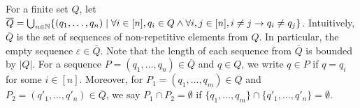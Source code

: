


%






For a finite set $Q$, let $\overline{Q} = \bigcup_{n\in \mathbb{N}}\{ (q_1, \ldots, q_n) \mid \forall i \in [n], q_i \in Q \wedge \forall i,j \in[n], i \neq j \rightarrow q_i \neq q_j \}$. Intuitively, $\overline{Q}$ is the set of sequences of non-repetitive elements from $Q$. In particular, the empty sequence $\varepsilon \in \overline{Q}$. Note that the length of each sequence from $\overline{Q}$ is bounded by  $| Q |$. For a sequence $P = (q_1, \ldots, q_n) \in \overline{Q}$ and  $q \in Q$, we write $q \in P$ if  $q = q_i$ for some $i \in [n]$. Moreover, for $P_1 = (q_1, \ldots, q_m) \in \overline{Q}$ and $P_2 = (q'_1, \ldots, q'_n) \in \overline{Q}$, we say $P_1 \cap P_2 = \emptyset$ if $\{q_1, \ldots, q_m\} \cap \{q'_1, \ldots, q'_n\} = \emptyset$.
    


